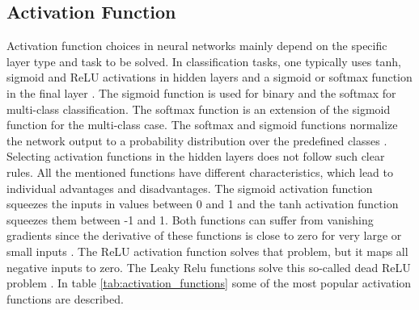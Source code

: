 \subsection{Activation Function}
Activation function choices in neural networks mainly depend on the specific layer type and task to be solved. In classification tasks, one typically uses tanh, sigmoid and ReLU activations in hidden layers and a sigmoid or softmax function in the final layer \cite{ShilohPerl2020}. The sigmoid function is used for binary and the softmax for multi-class classification. The softmax function is an extension of the sigmoid function for the multi-class case. The softmax and sigmoid functions normalize the network output to a probability distribution over the predefined classes \cite{ShilohPerl2020}. Selecting activation functions in the hidden layers does not follow such clear rules. All the mentioned functions have different characteristics, which lead to individual advantages and disadvantages. The sigmoid activation function squeezes the inputs in values between 0 and 1 and the tanh activation function squeezes them between -1 and 1. Both functions can suffer from vanishing gradients since the derivative of these functions is close to zero for very large or small inputs \cite{Calin2020}. The ReLU activation function solves that problem, but it maps all negative inputs to zero. The Leaky Relu functions solve this so-called dead ReLU problem  \cite{Dubey2019}. In table \ref{tab:activation_functions} some of the most popular activation functions are described.

